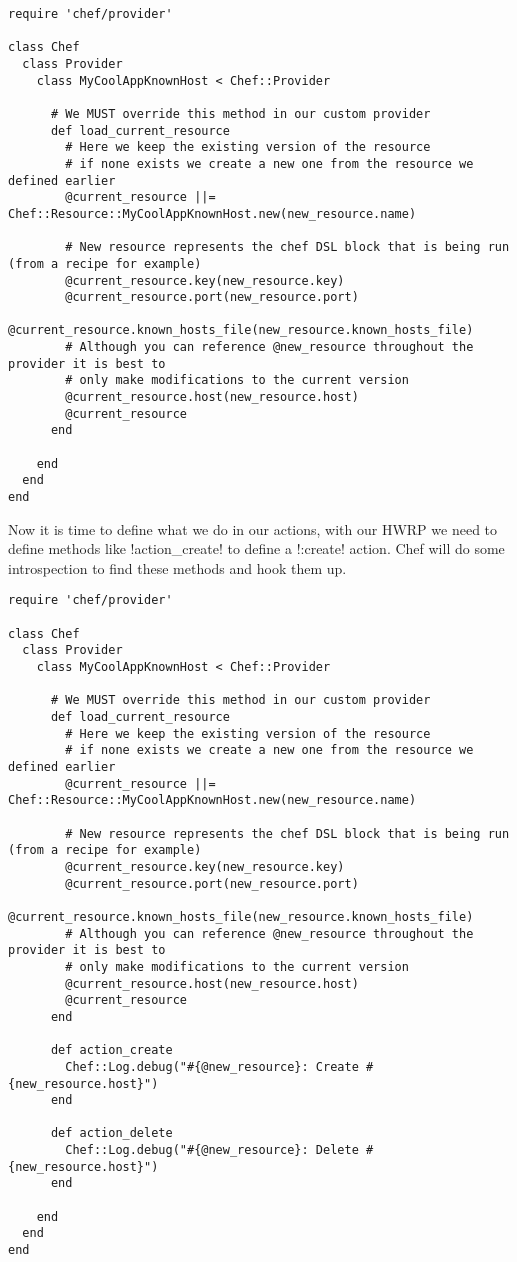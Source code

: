 \begin{lstlisting}[label=lst:cookbook-hwrp6]
require 'chef/provider'

class Chef
  class Provider
    class MyCoolAppKnownHost < Chef::Provider

      # We MUST override this method in our custom provider
      def load_current_resource
        # Here we keep the existing version of the resource
        # if none exists we create a new one from the resource we defined earlier
        @current_resource ||= Chef::Resource::MyCoolAppKnownHost.new(new_resource.name)

        # New resource represents the chef DSL block that is being run (from a recipe for example)
        @current_resource.key(new_resource.key)
        @current_resource.port(new_resource.port)
        @current_resource.known_hosts_file(new_resource.known_hosts_file)
        # Although you can reference @new_resource throughout the provider it is best to
        # only make modifications to the current version
        @current_resource.host(new_resource.host)
        @current_resource
      end

    end
  end
end
\end{lstlisting}

Now it is time to define what we do in our actions, with our HWRP we need to define methods like \inline!action_create! to define a \inline!:create! action. Chef will do some introspection to find these methods and hook them up.

\begin{lstlisting}[label=lst:cookbook-hwrp7]
require 'chef/provider'

class Chef
  class Provider
    class MyCoolAppKnownHost < Chef::Provider

      # We MUST override this method in our custom provider
      def load_current_resource
        # Here we keep the existing version of the resource
        # if none exists we create a new one from the resource we defined earlier
        @current_resource ||= Chef::Resource::MyCoolAppKnownHost.new(new_resource.name)

        # New resource represents the chef DSL block that is being run (from a recipe for example)
        @current_resource.key(new_resource.key)
        @current_resource.port(new_resource.port)
        @current_resource.known_hosts_file(new_resource.known_hosts_file)
        # Although you can reference @new_resource throughout the provider it is best to
        # only make modifications to the current version
        @current_resource.host(new_resource.host)
        @current_resource
      end

      def action_create
        Chef::Log.debug("#{@new_resource}: Create #{new_resource.host}")
      end

      def action_delete
        Chef::Log.debug("#{@new_resource}: Delete #{new_resource.host}")
      end

    end
  end
end
\end{lstlisting}

